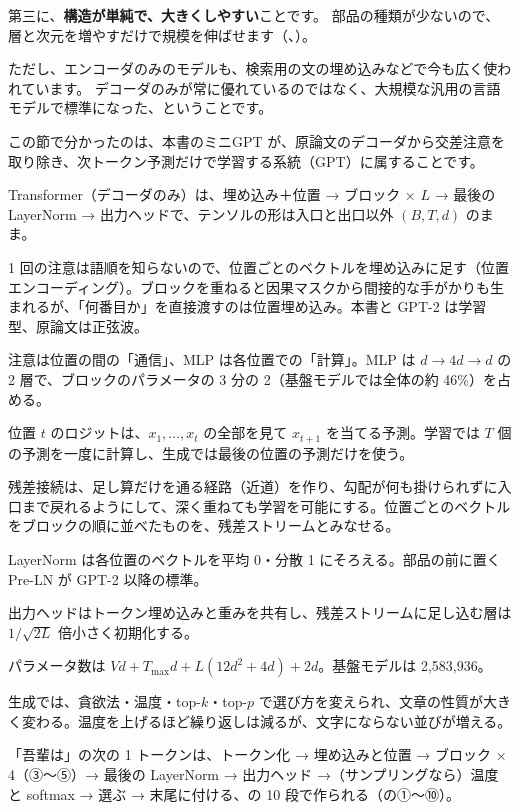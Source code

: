 第三に、\textbf{構造が単純で、大きくしやすい}ことです。
部品の種類が少ないので、層と次元を増やすだけで規模を伸ばせます（、）。

ただし、エンコーダのみのモデルも、検索用の文の埋め込みなどで今も広く使われています。
デコーダのみが常に優れているのではなく、大規模な汎用の言語モデルで標準になった、ということです。

この節で分かったのは、本書のミニGPT が、原論文のデコーダから交差注意を取り除き、次トークン予測だけで学習する系統（GPT）に属することです。

\begin{summary}
\item Transformer（デコーダのみ）は、埋め込み＋位置 → ブロック × $L$ → 最後の LayerNorm → 出力ヘッドで、テンソルの形は入口と出口以外 $(B,T,d)$ のまま。
\item 1 回の注意は語順を知らないので、位置ごとのベクトルを埋め込みに足す（位置エンコーディング）。ブロックを重ねると因果マスクから間接的な手がかりも生まれるが、「何番目か」を直接渡すのは位置埋め込み。本書と GPT-2 は学習型、原論文は正弦波。
\item 注意は位置の間の「通信」、MLP は各位置での「計算」。MLP は $d\to4d\to d$ の 2 層で、ブロックのパラメータの 3 分の 2（基盤モデルでは全体の約 46\%）を占める。
\item 位置 $t$ のロジットは、$x_1,\dots,x_t$ の全部を見て $x_{t+1}$ を当てる予測。学習では $T$ 個の予測を一度に計算し、生成では最後の位置の予測だけを使う。
\item 残差接続は、足し算だけを通る経路（近道）を作り、勾配が何も掛けられずに入口まで戻れるようにして、深く重ねても学習を可能にする。位置ごとのベクトルをブロックの順に並べたものを、残差ストリームとみなせる。
\item LayerNorm は各位置のベクトルを平均 0・分散 1 にそろえる。部品の前に置く Pre-LN が GPT-2 以降の標準。
\item 出力ヘッドはトークン埋め込みと重みを共有し、残差ストリームに足し込む層は $1/\sqrt{2L}$ 倍小さく初期化する。
\item パラメータ数は $Vd+T_{\max}d+L(12d^2+4d)+2d$。基盤モデルは 2,583,936。
\item 生成では、貪欲法・温度・top-$k$・top-$p$ で選び方を変えられ、文章の性質が大きく変わる。温度を上げるほど繰り返しは減るが、文字にならない並びが増える。
\item 「吾輩は」の次の 1 トークンは、トークン化 → 埋め込みと位置 → ブロック × 4（③〜⑤）→ 最後の LayerNorm → 出力ヘッド →（サンプリングなら）温度と softmax → 選ぶ → 末尾に付ける、の 10 段で作られる（の①〜⑩）。
\end{summary}

